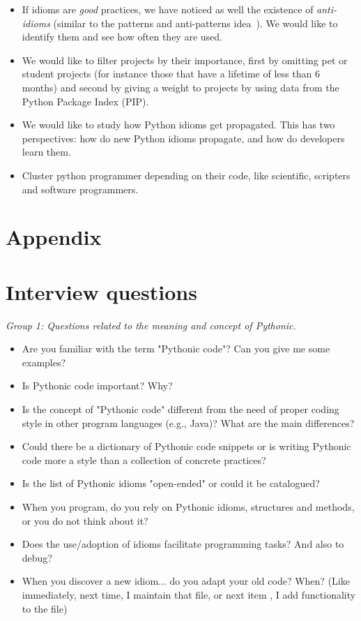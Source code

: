 \documentclass[a4paper]{article}
\begin{document}
\begin{itemize}
  
  \item If idioms are \emph{good} practices, we have noticed as well the existence of \emph{anti-idioms} (similar to the patterns and anti-patterns idea~\cite{brown1998antipatterns}). We would like to identify them and see how often they are used.
  
  \item We would like to filter projects by their importance, first by omitting pet or student projects (for instance those that have a lifetime of less than 6 months) and second by giving a weight to projects by using data from the Python Package Index (PIP).
  
  \item We would like to study how Python idioms get propagated. This has two perspectives: how do new Python idioms propagate, and how do developers learn them.
  
  \item Cluster python programmer depending on their code, like scientific, scripters and software programmers.

\end{itemize}



\section{Appendix}
\appendix
\section{Interview questions}
\textit{Group 1: Questions related to the meaning and concept of Pythonic.}
\begin{itemize}
   \item Are you familiar with the term "Pythonic code"? Can you give me some examples?
  
  \item Is Pythonic code important? Why?
  
  \item Is the concept of "Pythonic code" different from the need of proper coding style in other program languages (e.g., Java)? What are the main differences?
  \item Could there be a dictionary of Pythonic code snippets or is writing Pythonic code more a style than a collection of concrete practices?
  \item Is the list of Pythonic idioms "open-ended" or could it be catalogued?
  \item When you program, do you rely on Pythonic idioms, structures and methods, or you do not think about it?
  \item Does the use/adoption of idioms facilitate programming tasks? And also to debug?
  \item When you discover a new idiom... do you adapt your old code? When? (Like immediately, next time, I maintain that file, or next item , I add functionality to the file)
\end{itemize}
\end{document}
